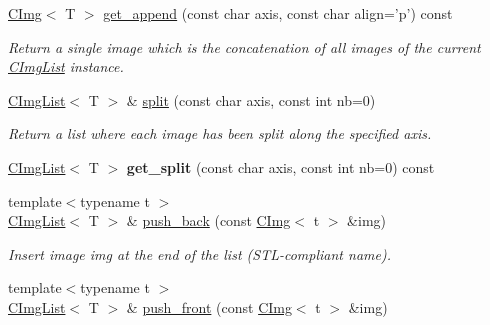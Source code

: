 \begin{DoxyCompactItemize}
\item 
\hyperlink{structcimg__library_1_1CImg}{CImg}$<$ T $>$ \hyperlink{structcimg__library_1_1CImgList_a563eced0a41cdb792b2b151b682f7ae5}{get\_\-append} (const char axis, const char align='p') const 
\begin{DoxyCompactList}\small\item\em Return a single image which is the concatenation of all images of the current \hyperlink{structcimg__library_1_1CImgList}{CImgList} instance. \item\end{DoxyCompactList}\item 
\hypertarget{structcimg__library_1_1CImgList_a3143702869165b83627245ca807a4709}{
\hyperlink{structcimg__library_1_1CImgList}{CImgList}$<$ T $>$ \& \hyperlink{structcimg__library_1_1CImgList_a3143702869165b83627245ca807a4709}{split} (const char axis, const int nb=0)}
\label{structcimg__library_1_1CImgList_a3143702869165b83627245ca807a4709}

\begin{DoxyCompactList}\small\item\em Return a list where each image has been split along the specified axis. \item\end{DoxyCompactList}\item 
\hypertarget{structcimg__library_1_1CImgList_adc2e5a953d030fca9af7af17119262a9}{
\hyperlink{structcimg__library_1_1CImgList}{CImgList}$<$ T $>$ {\bfseries get\_\-split} (const char axis, const int nb=0) const }
\label{structcimg__library_1_1CImgList_adc2e5a953d030fca9af7af17119262a9}

\item 
\hypertarget{structcimg__library_1_1CImgList_af014a9f295740c67d251221bfadaaed6}{
{\footnotesize template$<$typename t $>$ }\\\hyperlink{structcimg__library_1_1CImgList}{CImgList}$<$ T $>$ \& \hyperlink{structcimg__library_1_1CImgList_af014a9f295740c67d251221bfadaaed6}{push\_\-back} (const \hyperlink{structcimg__library_1_1CImg}{CImg}$<$ t $>$ \&img)}
\label{structcimg__library_1_1CImgList_af014a9f295740c67d251221bfadaaed6}

\begin{DoxyCompactList}\small\item\em Insert image {\ttfamily img} at the end of the list (STL-\/compliant name). \item\end{DoxyCompactList}\item 
\hypertarget{structcimg__library_1_1CImgList_a337ac076e4fd5851e8bba422b42dff01}{
{\footnotesize template$<$typename t $>$ }\\\hyperlink{structcimg__library_1_1CImgList}{CImgList}$<$ T $>$ \& \hyperlink{structcimg__library_1_1CImgList_a337ac076e4fd5851e8bba422b42dff01}{push\_\-front} (const \hyperlink{structcimg__library_1_1CImg}{CImg}$<$ t $>$ \&img)}
\label{structcimg__library_1_1CImgList_a337ac076e4fd5851e8bba422b42dff01}


\end{DoxyCompactItemize}
